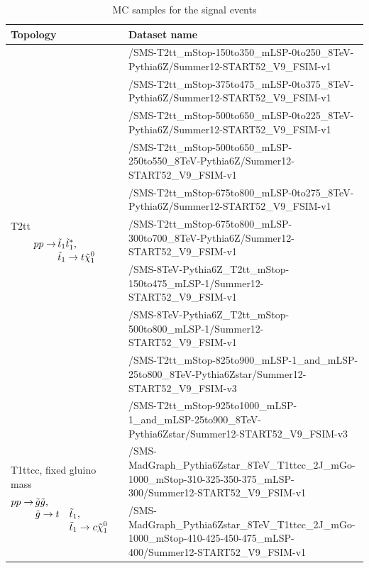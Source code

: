 \begin{table}
\fontsize{8 pt}{1 em}
\selectfont
\caption{MC samples for the signal events}
\begin{center}
\begin{tabular}{l l}
\toprule
Topology & Dataset name \\
\midrule
\multirow{10}{4cm}{T2tt \begin{align*}
pp \rightarrow\, &\tilde{t}_1 \tilde{t}_1^*, \\[-3pt]
               &\tilde{t}_1 \rightarrow t \tilde{\chi}_1^0 \\[-3pt]
               \end{align*}} &
/SMS-T2tt\_mStop-150to350\_mLSP-0to250\_8TeV-Pythia6Z/Summer12-START52\_V9\_FSIM-v1 \\
& /SMS-T2tt\_mStop-375to475\_mLSP-0to375\_8TeV-Pythia6Z/Summer12-START52\_V9\_FSIM-v1 \\
& /SMS-T2tt\_mStop-500to650\_mLSP-0to225\_8TeV-Pythia6Z/Summer12-START52\_V9\_FSIM-v1 \\
& /SMS-T2tt\_mStop-500to650\_mLSP-250to550\_8TeV-Pythia6Z/Summer12-START52\_V9\_FSIM-v1 \\
& /SMS-T2tt\_mStop-675to800\_mLSP-0to275\_8TeV-Pythia6Z/Summer12-START52\_V9\_FSIM-v1 \\
& /SMS-T2tt\_mStop-675to800\_mLSP-300to700\_8TeV-Pythia6Z/Summer12-START52\_V9\_FSIM-v1 \\
& /SMS-8TeV-Pythia6Z\_T2tt\_mStop-150to475\_mLSP-1/Summer12-START52\_V9\_FSIM-v1 \\
& /SMS-8TeV-Pythia6Z\_T2tt\_mStop-500to800\_mLSP-1/Summer12-START52\_V9\_FSIM-v1 \\
& /SMS-T2tt\_mStop-825to900\_mLSP-1\_and\_mLSP-25to800\_8TeV-Pythia6Zstar/Summer12-START52\_V9\_FSIM-v3 \\
& /SMS-T2tt\_mStop-925to1000\_mLSP-1\_and\_mLSP-25to900\_8TeV-Pythia6Zstar/Summer12-START52\_V9\_FSIM-v3 \\
\midrule
\multirow{6}{4cm}{T1ttcc, fixed gluino mass 
\begin{alignat*}{3}
pp \rightarrow\, &\tilde{g} \tilde{g}, \\[-3pt]
               &\tilde{g} \rightarrow t &&\tilde{t}_1, \\[-3pt]
               & &&\tilde{t}_1 \rightarrow c \tilde{\chi}_1^0
\end{alignat*}}
&/SMS-MadGraph\_Pythia6Zstar\_8TeV\_T1ttcc\_2J\_mGo-1000\_mStop-310-325-350-375\_mLSP-300/Summer12-START52\_V9\_FSIM-v1 \\
&/SMS-MadGraph\_Pythia6Zstar\_8TeV\_T1ttcc\_2J\_mGo-1000\_mStop-410-425-450-475\_mLSP-400/Summer12-START52\_V9\_FSIM-v1 \\

\end{tabular}
\end{center}
\end{table}
